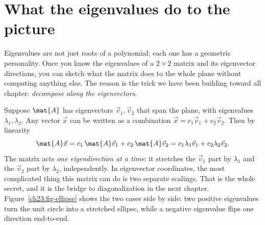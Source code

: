 \section{What the eigenvalues do to the picture}
\label{ch23:geometry}

Eigenvalues are not just roots of a polynomial; each one has a geometric
personality. Once you know the eigenvalues of a $2\times 2$ matrix and its
eigenvector directions, you can sketch what the matrix does to the whole plane
without computing anything else. The reason is the trick we have been building
toward all chapter: \emph{decompose along the eigenvectors}.

Suppose $\mat{A}$ has eigenvectors $\vec{v}_1,\vec{v}_2$ that span the plane, with
eigenvalues $\lambda_1,\lambda_2$. Any vector $\vec{x}$ can be written as a
combination $\vec{x}=c_1\vec{v}_1+c_2\vec{v}_2$. Then by linearity
\[
  \mat{A}\vec{x}
  =c_1\,\mat{A}\vec{v}_1+c_2\,\mat{A}\vec{v}_2
  =c_1\lambda_1\vec{v}_1+c_2\lambda_2\vec{v}_2.
\]
The matrix acts \emph{one eigendirection at a time}: it stretches the $\vec{v}_1$
part by $\lambda_1$ and the $\vec{v}_2$ part by $\lambda_2$, independently. In
eigenvector coordinates, the most complicated thing this matrix can do is two
separate scalings. That is the whole secret, and it is the bridge to
diagonalization in the next chapter. Figure~\ref{ch23:fig-ellipse} shows the two
cases side by side: two positive eigenvalues turn the unit circle into a stretched
ellipse, while a negative eigenvalue flips one direction end-to-end.

